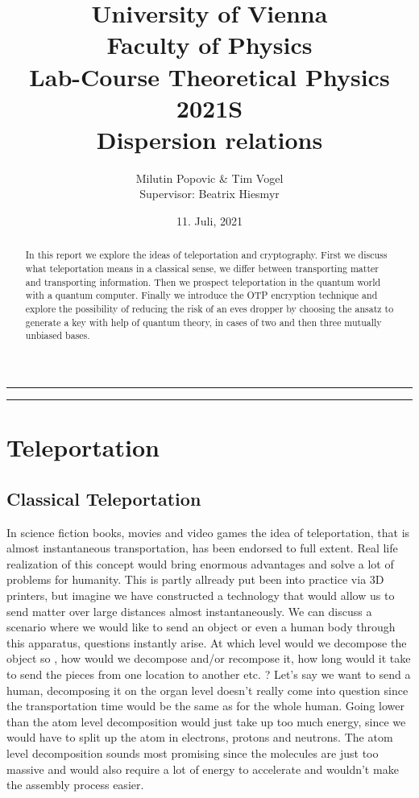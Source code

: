 \documentclass[a4paper]{article}
\title{University of Vienna\\ Faculty of Physics\\
\vspace{1.25cm}Lab-Course Theoretical Physics 2021S \\ Dispersion relations
}
\author{Milutin Popovic \& Tim Vogel \vspace{1cm}\\ Supervisor: Beatrix Hiesmyr}
\date{11. Juli, 2021}
\begin{document}
\maketitle
\noindent\rule[0.5ex]{\linewidth}{1pt}
\begin{abstract}
In this report we explore the ideas of teleportation and cryptography. First we discuss what teleportation means in a classical sense, we differ between transporting matter and transporting information. Then we prospect teleportation in the quantum world with a quantum computer. Finally we introduce the OTP encryption technique and explore the possibility of reducing the risk of an eves dropper by choosing the ansatz to generate a key with help of quantum theory, in cases of two and then three mutually unbiased bases.
\end{abstract}
\noindent\rule[0.5ex]{\linewidth}{1pt}

\tableofcontents
\section{Teleportation}
\subsection{Classical Teleportation}
In science fiction books, movies and video games the idea of teleportation,
that is almost instantaneous transportation, has been endorsed to full extent.
Real life realization of this concept would bring enormous advantages and solve
a lot of problems for humanity. This is partly allready put been into practice via
3D printers, but imagine we have constructed a technology that would allow us
to send matter over large distances almost instantaneously. We can discuss a
scenario where we would like to send an object or even a human body through
this apparatus, questions instantly arise.  At which level would we decompose
the object so , how would we decompose and/or recompose it, how long would it take to send
the pieces from one location to another etc. ? Let's say we want to send a
human, decomposing it on the organ level doesn't really come into question
since the transportation time would be the same as for the whole human.
Going lower than the atom level decomposition would just take up too much
energy, since we would have to split up the atom in electrons, protons and
neutrons. The atom level decomposition sounds most promising since the
molecules are just too massive and would also require a lot of energy to
accelerate and wouldn't make the assembly process easier.
\end{document}
